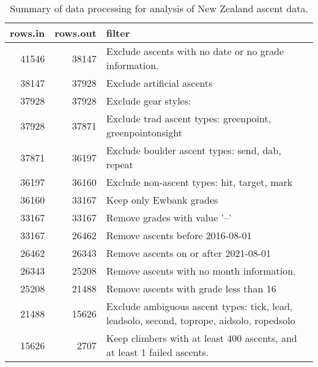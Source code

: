 \begin{table}[ht]
\centering
\begingroup\fontsize{9pt}{10pt}\selectfont
\begin{tabular}{rrl}
  \hline
{\bf rows.in} & {\bf rows.out} & {\bf filter} \\ 
  \hline
41546 & 38147 & Exclude ascents with no date or no grade information. \\ 
  38147 & 37928 & Exclude artificial ascents \\ 
  37928 & 37928 & Exclude gear styles:  \\ 
  37928 & 37871 & Exclude trad ascent types: greenpoint, greenpointonsight \\ 
  37871 & 36197 & Exclude boulder ascent types: send, dab, repeat \\ 
  36197 & 36160 & Exclude non-ascent types: hit, target, mark \\ 
  36160 & 33167 & Keep only Ewbank grades \\ 
  33167 & 33167 & Remove grades with value '--' \\ 
  33167 & 26462 & Remove ascents before 2016-08-01 \\ 
  26462 & 26343 & Remove ascents on or after 2021-08-01 \\ 
  26343 & 25208 & Remove ascents with no month information. \\ 
  25208 & 21488 & Remove ascents with grade less than 16 \\ 
  21488 & 15626 & Exclude ambiguous ascent types: tick, lead, leadsolo, second, toprope, aidsolo, ropedsolo \\ 
  15626 & 2707 & Keep climbers with at least 400 ascents, and at least 1 failed ascents. \\ 
   \hline
\end{tabular}
\endgroup
\caption{Summary of data processing for analysis of New Zealand ascent data.} 
\label{table-data-processing-nz}
\end{table}
